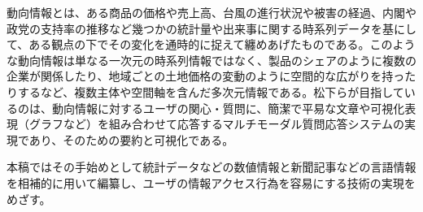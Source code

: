 \documentclass{matsushita-zemi}
\begin{document}
動向情報とは、ある商品の価格や売上高、台風の進行状況や被害の経過、内閣や政党の支持率の推移など幾つかの統計量や出来事に関する時系列データを基にして、ある観点の下でその変化を通時的に捉えて纏めあげたものである。このような動向情報は単なる一次元の時系列情報ではなく、製品のシェアのように複数の企業が関係したり、地域ごとの土地価格の変動のように空間的な広がりを持ったりするなど、複数主体や空間軸を含んだ多次元情報である。松下らが目指しているのは、動向情報に対するユーザの関心・質問に、簡潔で平易な文章や可視化表現（グラフなど）を組み合わせて応答するマルチモーダル質問応答システムの実現であり、そのための要約と可視化である。

本稿ではその手始めとして統計データなどの数値情報と新聞記事などの言語情報を相補的に用いて編纂し、ユーザの情報アクセス行為を容易にする技術の実現をめざす。



\end{document}
